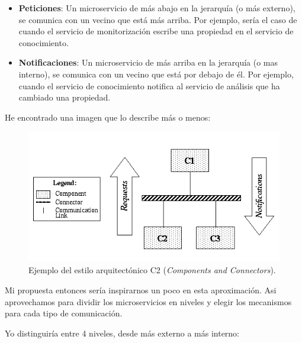 \begin{itemize}
  \item \textbf{Peticiones}: Un microservicio de más abajo en la jerarquía (o más externo), se comunica con un vecino que está más arriba. Por ejemplo, sería el caso de cuando el servicio de monitorización escribe una propiedad en el servicio de conocimiento.

  \item \textbf{Notificaciones}: Un microservicio de más arriba en la jerarquía (o mas interno), se comunica con un vecino que está por debajo de él. Por ejemplo, cuando el servicio de conocimiento notifica al servicio de análisis que ha cambiado una propiedad.
\end{itemize}

He encontrado una imagen que lo describe más o menos:

\begin{figure}[htb]
  \centering
  \includegraphics[scale=0.45]{03_arquitectura/images/c2SampleArch}
  \caption[Ejemplo del estilo arquitectónico C2 (\emph{Components and Connectors})]{Ejemplo del estilo arquitectónico C2 (\emph{Components and Connectors}). \cite{UCISoftwareArchitecture}}
  \label{fig:C2-arch-example}
\end{figure}

Mi propuesta entonces sería inspirarnos un poco en esta aproximación. Asi aprovechamos para dividir los microservicios en niveles y elegir los mecanismos para cada tipo de comunicación.

Yo distinguiría entre 4 niveles, desde más externo a más interno:

